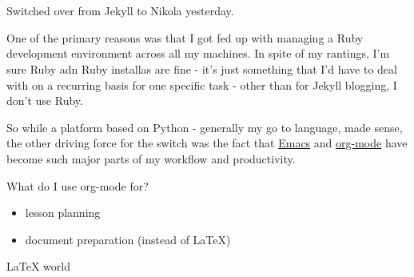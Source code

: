 \documentclass[11pt]{article}
\author{Mike Zamansky}
\date{\today}
\title{}
\begin{document}
\tableofcontents


\section{}
\label{sec:orgheadline1}
Switched over from Jekyll to Nikola yesterday.

One of the primary reasons was that I got fed up with managing a Ruby
development environment across all my machines. In spite of my
rantings, I'm sure Ruby adn Ruby installas are fine - it's just
something that I'd have to deal with on a recurring basis for one
specific task - other than for Jekyll blogging, I don't use Ruby.

So while a platform based on Python - generally my go to language,
made sense, the other driving force for the switch was the fact that
\href{https://www.gnu.org/software/emacs/}{Emacs} and \href{http://orgmode.org/}{org-mode} have become such major parts of my workflow and
productivity.

What do I use org-mode for?
\begin{itemize}
\item lesson planning
\item document preparation (instead of \LaTeX  )
\end{itemize}

\LaTeX
world
\end{document}
